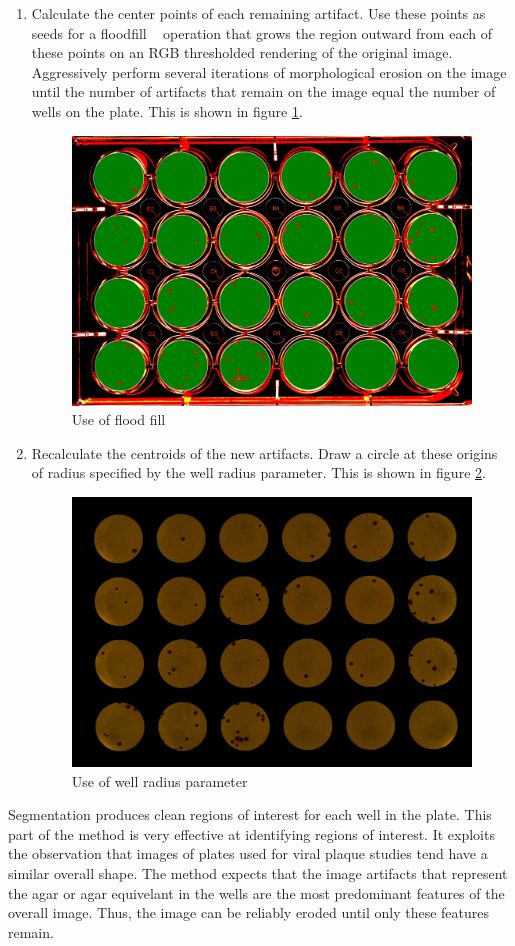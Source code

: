 \documentclass[11pt,final,twocolumn]{IEEEtran}
\begin{document}
\begin{enumerate}
\item
Calculate the center points of each remaining artifact. Use these points as seeds for a floodfill ~\cite{floodfill} operation that grows the region outward from each of these points on an RGB thresholded rendering of the original image.
Aggressively perform several iterations of morphological erosion on the image until the number of artifacts that remain on the image equal the number of wells on the plate. This is shown in figure \ref{fig:segFloodFill}.
\begin{figure}[H]
\centering
\includegraphics[width=.4\textwidth]{segmentFloodFill.jpg}
\caption{Use of flood fill}
\label{fig:segFloodFill}
\end{figure}

\item
Recalculate the centroids of the new artifacts. Draw a circle at these origins of radius specified by the well radius parameter. This is shown in figure \ref{fig:segUseRadius}.
\begin{figure}[H]
\centering
\includegraphics[width=.4\textwidth]{segmentUseRadius.jpg}
\caption{Use of well radius parameter}
\label{fig:segUseRadius}
\end{figure}

\end{enumerate}

Segmentation produces clean regions of interest for each well in the plate. This part of the method is very effective at identifying regions of interest. It exploits the observation that images of plates used for viral plaque studies tend have a similar overall shape. The method expects that the image artifacts that represent the agar or agar equivelant in the wells are the most predominant features of the overall image.    Thus, the image can be reliably eroded until only these features remain.  
\end{document}

